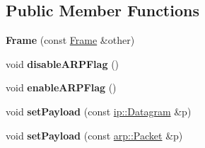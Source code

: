 \subsection*{Public Member Functions}
\begin{DoxyCompactItemize}
\item 
{\bfseries Frame} (const \hyperlink{structlink_1_1Frame}{Frame} \&other)\hypertarget{structlink_1_1Frame_aea0b6d8d213840254aac152351a7c46a}{}\label{structlink_1_1Frame_aea0b6d8d213840254aac152351a7c46a}

\item 
void {\bfseries disable\+A\+R\+P\+Flag} ()\hypertarget{structlink_1_1Frame_a7dfe0d1f9213795013c55120438b9790}{}\label{structlink_1_1Frame_a7dfe0d1f9213795013c55120438b9790}

\item 
void {\bfseries enable\+A\+R\+P\+Flag} ()\hypertarget{structlink_1_1Frame_aa27284375795ced3f503efcd617fb65e}{}\label{structlink_1_1Frame_aa27284375795ced3f503efcd617fb65e}

\item 
void {\bfseries set\+Payload} (const \hyperlink{structip_1_1Datagram}{ip\+::\+Datagram} \&p)\hypertarget{structlink_1_1Frame_af14b9acc0bd67497f8d008425c36462e}{}\label{structlink_1_1Frame_af14b9acc0bd67497f8d008425c36462e}

\item 
void {\bfseries set\+Payload} (const \hyperlink{structlink_1_1arp_1_1Packet}{arp\+::\+Packet} \&p)\hypertarget{structlink_1_1Frame_a9eb67e1eb8d928dba0a42451edb590eb}{}\label{structlink_1_1Frame_a9eb67e1eb8d928dba0a42451edb590eb}

\end{DoxyCompactItemize}
